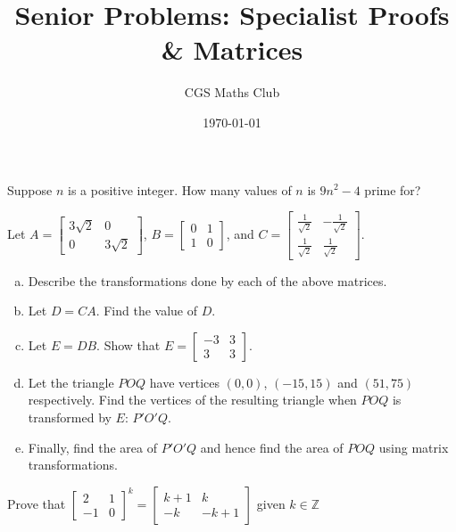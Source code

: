 \documentclass[11pt]{article}
\title{Senior Problems: Specialist Proofs \& Matrices}
\author{CGS Maths Club}
\date{\today}
\newenvironment{problem}[2][Problem]{\begin{trivlist}
\item[\hskip \labelsep {\bfseries #1}\hskip \labelsep {\bfseries #2.}]}{\end{trivlist}}
\begin{document}
\maketitle

\begin{problem}{1}
Suppose $n$ is a positive integer. How many values of $n$ is $9n^{2}-4$ prime for?
\end{problem}

\begin{problem}{2}
	Let 
	$A=
	\begin{bmatrix}
	3\sqrt{2} & 0\\
	0 & 3\sqrt{2}
	\end{bmatrix}
	$, 
	$B=
	\begin{bmatrix}
	0 & 1\\
	1 & 0
	\end{bmatrix}
	$, and 
	$
	C=
	\begin{bmatrix}
	\frac{1}{\sqrt{2}} & -\frac{1}{\sqrt{2}}\\
	\frac{1}{\sqrt{2}} & \frac{1}{\sqrt{2}}
	\end{bmatrix}
	$.
	\begin{enumerate}[a.]
		\item Describe the transformations done by each of the above matrices.
		\item Let $D = CA$. Find the value of $D$.
		\item Let $E = DB$. Show that $E = \begin{bmatrix}-3 & 3\\3 & 3\end{bmatrix}$.
		\item Let the triangle $POQ$ have vertices $(0, 0)$, $(-15, 15)$ and $(51, 75)$ respectively. Find the vertices of the resulting triangle when $POQ$ is transformed by $E$: $P'O'Q$.
		\item Finally, find the area of $P'O'Q$ and hence find the area of $POQ$ using matrix transformations.
	\end{enumerate}
\end{problem}

\begin{problem}{3}
	Prove that 
	$
	\begin{bmatrix}
	2 & 1\\
	-1 & 0
	\end{bmatrix}^{k}
	=
	\begin{bmatrix}
	k+1 & k\\
	-k & -k+1
	\end{bmatrix}
	$
	given $k \in \mathbb{Z}$
\end{problem}
\end{document}
